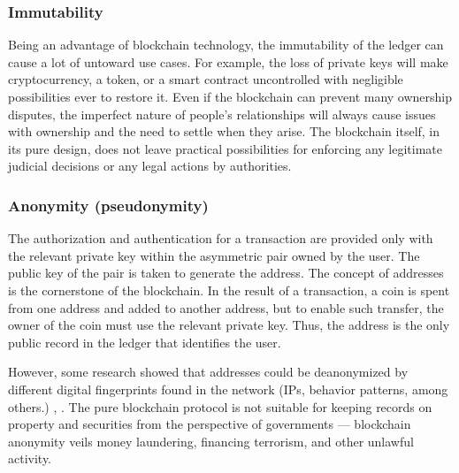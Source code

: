 \begin{multicols}{2}
\vspace{-.7cm}

\subsubsection{Immutability}\label{subsubsec-03.1.2}

\vspace{-.4cm}

Being an advantage of blockchain technology, the immutability of the ledger can cause a lot of untoward use cases. For example, the loss of private keys will make cryptocurrency, a token, or a smart contract uncontrolled with negligible possibilities ever to restore it. Even if the blockchain can prevent many ownership disputes, the imperfect nature of people’s relationships will always cause issues with ownership and the need to settle when they arise. The blockchain itself, in its pure design, does not leave practical possibilities for enforcing any legitimate judicial decisions or any legal actions by authorities.

\vspace{-.7cm}

\subsubsection{Anonymity (pseudonymity)}\label{subsubsec-03.1.3}

\vspace{-.4cm}

The authorization and authentication for a transaction are provided only with the relevant private key within the asymmetric pair owned by the user. The public key of the pair is taken to generate the address. The concept of addresses is the cornerstone of the blockchain. In the result of a transaction, a coin is spent from one address and added to another address, but to enable such transfer, the owner of the coin must use the relevant private key. Thus, the address is the only public record in the ledger that identifies the user. 

However, some research showed that addresses could be deanonymized by different digital fingerprints found in the network (IPs, behavior patterns, among others.) \cite{art1-key15}, \cite{art1-key16}. The pure blockchain protocol is not suitable for keeping records on property and securities from the perspective of governments — blockchain anonymity veils money laundering, financing terrorism, and other unlawful activity.


\end{multicols}
